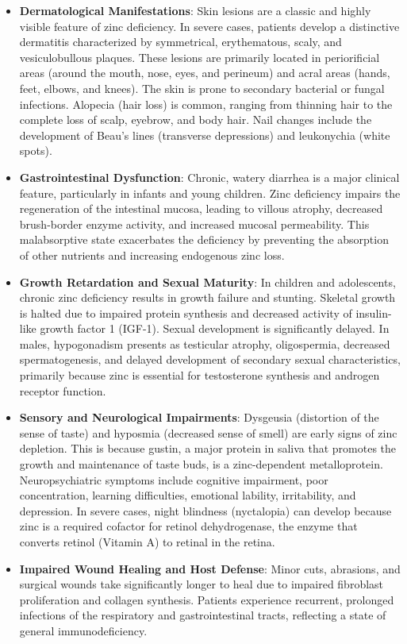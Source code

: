 \begin{itemize}
    \item \textbf{Dermatological Manifestations}: Skin lesions are a classic and highly visible feature of zinc deficiency. In severe cases, patients develop a distinctive dermatitis characterized by symmetrical, erythematous, scaly, and vesiculobullous plaques. These lesions are primarily located in periorificial areas (around the mouth, nose, eyes, and perineum) and acral areas (hands, feet, elbows, and knees). The skin is prone to secondary bacterial or fungal infections. Alopecia (hair loss) is common, ranging from thinning hair to the complete loss of scalp, eyebrow, and body hair. Nail changes include the development of Beau's lines (transverse depressions) and leukonychia (white spots).
    \item \textbf{Gastrointestinal Dysfunction}: Chronic, watery diarrhea is a major clinical feature, particularly in infants and young children. Zinc deficiency impairs the regeneration of the intestinal mucosa, leading to villous atrophy, decreased brush-border enzyme activity, and increased mucosal permeability. This malabsorptive state exacerbates the deficiency by preventing the absorption of other nutrients and increasing endogenous zinc loss.
    \item \textbf{Growth Retardation and Sexual Maturity}: In children and adolescents, chronic zinc deficiency results in growth failure and stunting. Skeletal growth is halted due to impaired protein synthesis and decreased activity of insulin-like growth factor 1 (IGF-1). Sexual development is significantly delayed. In males, hypogonadism presents as testicular atrophy, oligospermia, decreased spermatogenesis, and delayed development of secondary sexual characteristics, primarily because zinc is essential for testosterone synthesis and androgen receptor function.
    \item \textbf{Sensory and Neurological Impairments}: Dysgeusia (distortion of the sense of taste) and hyposmia (decreased sense of smell) are early signs of zinc depletion. This is because gustin, a major protein in saliva that promotes the growth and maintenance of taste buds, is a zinc-dependent metalloprotein. Neuropsychiatric symptoms include cognitive impairment, poor concentration, learning difficulties, emotional lability, irritability, and depression. In severe cases, night blindness (nyctalopia) can develop because zinc is a required cofactor for retinol dehydrogenase, the enzyme that converts retinol (Vitamin A) to retinal in the retina.
    \item \textbf{Impaired Wound Healing and Host Defense}: Minor cuts, abrasions, and surgical wounds take significantly longer to heal due to impaired fibroblast proliferation and collagen synthesis. Patients experience recurrent, prolonged infections of the respiratory and gastrointestinal tracts, reflecting a state of general immunodeficiency.
\end{itemize}

